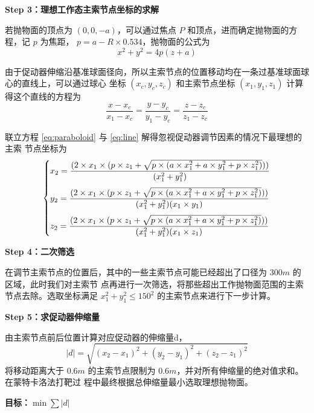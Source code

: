 \documentclass[withoutpreface,bwprint]{cumcmthesis} %
\begin{document}
\textbf{Step 3：理想工作态主索节点坐标的求解}

若抛物面的顶点为 $(0,0,-a)$，可以通过焦点 $P$ 和顶点，进而确定抛物面的方程，记 $p$ 为焦距，
$p = a-R \times 0.534$，抛物面的公式为
\begin{equation}
    \label{eq:paraboloid}
    x^2 + y^2 = 4p(z + a)
\end{equation}

由于促动器伸缩沿基准球面径向，所以主索节点的位置移动均在一条过基准球面球心的直线上，可以通过球心
坐标 $(x_c,y_c,z_c)$ 和主索节点坐标 $(x_1,y_1,z_1)$ 计算得这个直线的方程为
\begin{equation}
    \label{eq:line}
    \frac{\displaystyle x - x_c}{\displaystyle x_1 - x_c} = \frac{\displaystyle y - y_c}
    {\displaystyle y_1 - y_c} = \frac{\displaystyle z - z_c}{\displaystyle z_1 - z_c}
\end{equation}

联立方程 \eqref{eq:paraboloid} 与 \eqref{eq:line} 解得忽视促动器调节因素的情况下最理想的主索
节点坐标为
\[
\begin{dcases}
    \smallskip
    x_2 = \frac{(2\times x_1\times (p\times z_1 + \sqrt{p\times (a\times x_1^2 + a\times
    y_1^2 + p\times z_1^2)}))}{(x_1^2 + y_1^2)}  \\
    \smallskip
    y_2 = \frac{(2\times x_1\times (p\times z_1 + \sqrt{p\times (a\times x_1^2 + a\times
    y_1^2 + p\times z_1^2)}))}{(x_1^2 + y_1^2)(x_1 \times y_1)}  \\
    z_2 = \frac{(2\times x_1\times (p\times z_1 + \sqrt{p\times (a\times x_1^2 + a\times
    y_1^2 + p\times z_1^2)}))}{(x_1^2 + y_1^2)(x_1 \times z_1)}  \\
\end{dcases}
\]

\textbf{Step 4：二次筛选}

在调节主索节点的位置后，其中的一些主索节点可能已经超出了口径为 $300m$ 的区域，此时我们对主索节
点再进行一次筛选，将那些超出工作抛物面范围的主索节点去除。选取坐标满足 $x_1^2 + y_1^2 \leqslant  150^2$
的主索节点来进行下一步计算。

\textbf{Step 5：求促动器伸缩量}

由主索节点前后位置计算对应促动器的伸缩量d，
\[
    |d| = \sqrt{(x_2-x_1)^2 + (y_2-y_1)^2 + (z_2-z_1)^2}
\]
将移动距离大于 $0.6m$ 的主索节点限制为 $0.6m$，并对所有伸缩量的绝对值求和。在蒙特卡洛法打靶过
程中最终根据总伸缩量最小选取理想抛物面。

\medskip
\textbf{目标：$\min\sum |d|$}
\end{document}
